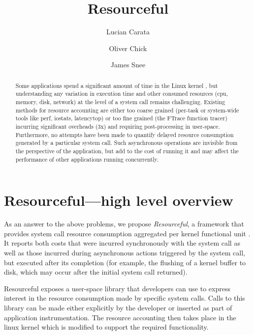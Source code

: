 \documentclass[12pt]{article}
\title{Resourceful}
\author{Lucian Carata \and Oliver Chick \and James Snee}
\date{}
\begin{document}
\maketitle{}

\begin{abstract}
Some applications spend a significant amount of time in the Linux kernel \cite{kernelscale}, but understanding any variation in execution time and other consumed resources (cpu, memory, disk, network) at the level of a system call remains challenging.
Existing methods for resource accounting are either too coarse grained (per-task or system-wide tools like perf, iostats, latencytop) or too fine grained (the FTrace function tracer) incurring significant overheads (3x) and requiring post-processing in user-space.
Furthermore, no attempts have been made to quantify delayed resource consumption generated by a particular system call. Such asynchronous operations are invisible from the perspective of the application, but add to the cost of running it and may affect the performance of other applications running concurrently.
\end{abstract}

\section{Resourceful---high level overview}
  As an answer to the above problems, we propose \emph{Resourceful}, a framework that provides system call resource consumption aggregated per kernel functional unit \cite{kernelmap}. It reports both costs that were incurred synchronously with the system call as well as those incurred during asynchronous actions triggered by the system call, but executed after its completion (for example, the flushing of a kernel buffer to disk, which may occur after the initial system call returned).

Resourceful exposes a user-space library that developers can use to express interest in the resource consumption made by specific system calls. Calls to this library can be made either explicitly by the developer or inserted as part of application instrumentation. The resource accounting then takes place in the linux kernel which is modified to support the required functionality.
\end{document}
